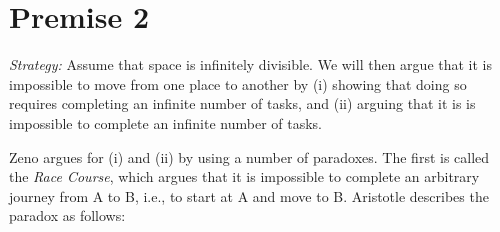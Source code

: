 \documentclass[oneside]{article}
\begin{document}
\section*{Premise 2}\label{premise-2}


\emph{Strategy:} Assume that space is infinitely divisible. We will then argue
that it is impossible to move from one place to another by (i) showing that doing so requires completing an infinite number of tasks, and (ii) arguing that it is is impossible to complete an infinite number of tasks.

\noindent Zeno argues for (i) and (ii) by using a number of paradoxes. The first is
called the \emph{Race Course}, which argues that it is impossible to complete
an arbitrary journey from A to B, i.e., to start at A and move to B. Aristotle describes the paradox as follows:
\end{document}
